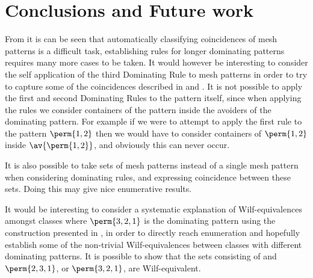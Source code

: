 \chapter{Conclusions and Future work}
From  it is can be seen that automatically classifying
coincidences of mesh patterns is a difficult task, establishing rules for longer
dominating patterns requires many more cases to be taken. It would however
be interesting to consider the self application of the  third Dominating Rule to mesh
patterns in order to try to capture some of the coincidences described in
\textcite{DBLP:journals/combinatorics/HilmarssonJSVU15} and \textcite{journals/combinatorics/BrandenC11}.
It is not possible to apply the first and second Dominating Rules to the pattern
itself, since when applying the rules we consider containers of the pattern inside
the avoiders of the dominating pattern. For example if we were to attempt to apply
the first rule to the pattern \(\perm{1,2}\) then we would have to consider
containers of \(\perm{1,2}\) inside \(\av{\perm{1,2}}\), and obviously this can
never occur.

It is also possible to take sets of mesh patterns instead of a single mesh pattern
when considering dominating rules, and expressing coincidence between these sets.
Doing this may give nice enumerative results.

It would be interesting to consider a systematic explanation of Wilf-equivalences
amongst classes where \(\perm{3,2,1}\) is the dominating pattern using the
construction presented in \cite[Sec.~12]{2015arXiv151203226B}, in order to directly
reach enumeration and hopefully establish some of the non-trivial Wilf-equivalences
between classes with different dominating patterns. It is possible to show that
the sets consisting of  and
\(\perm{2,3,1}\), or \(\perm{3,2,1}\), are Wilf-equivalent. 
